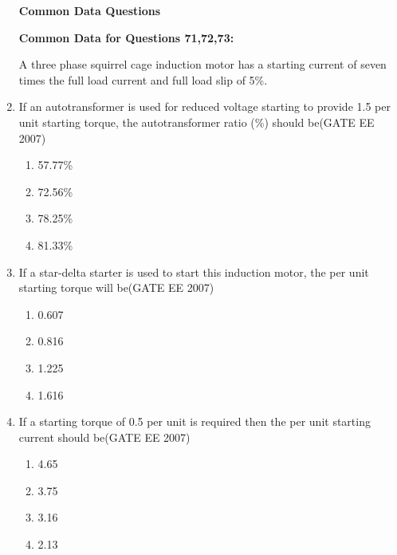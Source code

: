 \documentclass[a4paper,10pt]{exam}
\theoremstyle{remark}
\begin{document}
\begin{enumerate}
\vfill
{}
\newpage

\textbf{Common Data Questions}\\

\vspace{1cm}

\raggedright{\textbf{Common Data for Questions 71,72,73:}}

A three phase squirrel cage induction motor has a starting current of seven times the full load current and full load slip of 5\%.

\vspace{1em}

\item   If an autotransformer is used for reduced voltage starting to provide 1.5 per unit starting torque, the autotransformer ratio (\%) should be\hfill{(GATE EE 2007)}

\begin{multicols}{4}
\begin{enumerate}
\item  57.77\% 
\item  72.56\% 
\item  78.25\% 
\item  81.33\%
\end{enumerate}
\end{multicols}

\vspace{0.5em}

\item   If a star-delta starter is used to start this induction motor, the per unit starting torque will be\hfill{(GATE EE 2007)}

\begin{multicols}{4}
\begin{enumerate}
    \item  0.607
 \item  0.816
 \item  1.225
 \item  1.616
\end{enumerate}
\end{multicols}

\vspace{0.5em}

\item If a starting torque of 0.5 per unit is required then the per unit starting current should be\hfill{(GATE EE 2007)}

\begin{multicols}{4}
\begin{enumerate}
\item 4.65 
\item 3.75 
\item 3.16 
\item 2.13 
\end{enumerate}
\end{multicols}


\end{enumerate}
\end{document}
